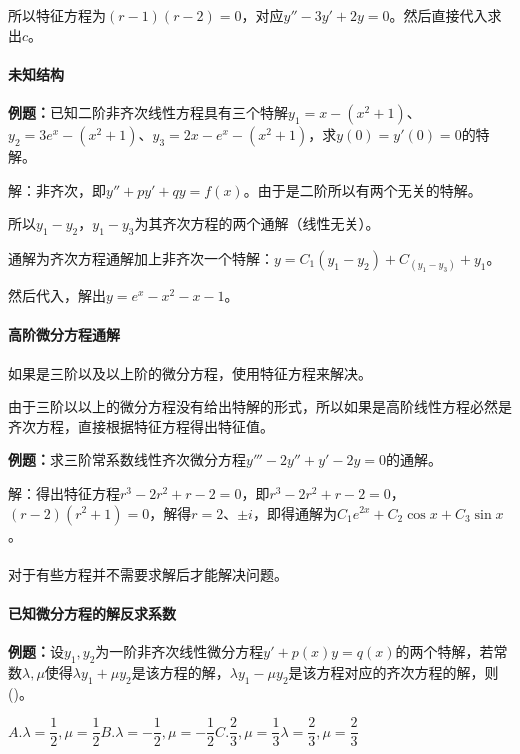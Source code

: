 所以特征方程为$(r-1)(r-2)=0$，对应$y''-3y'+2y=0$。然后直接代入求出$c$。

\paragraph{未知结构} \leavevmode \medskip

\textbf{例题：}已知二阶非齐次线性方程具有三个特解$y_1=x-(x^2+1)$、$y_2=3e^x-(x^2+1)$、$y_3=2x-e^x-(x^2+1)$，求$y(0)=y'(0)=0$的特解。

解：非齐次，即$y''+py'+qy=f(x)$。由于是二阶所以有两个无关的特解。

所以$y_1-y_2$，$y_1-y_3$为其齐次方程的两个通解（线性无关）。

通解为齐次方程通解加上非齐次一个特解：$y=C_1(y_1-y_2)+C_(y_1-y_3)+y_1$。

然后代入，解出$y=e^x-x^2-x-1$。

\paragraph{高阶微分方程通解}

如果是三阶以及以上阶的微分方程，使用特征方程来解决。

由于三阶以以上的微分方程没有给出特解的形式，所以如果是高阶线性方程必然是齐次方程，直接根据特征方程得出特征值。

\textbf{例题：}求三阶常系数线性齐次微分方程$y'''-2y''+y'-2y=0$的通解。

解：得出特征方程$r^3-2r^2+r-2=0$，即$r^3-2r^2+r-2=0$，$(r-2)(r^2+1)=0$，解得$r=2$、$\pm i$，即得通解为$C_1e^{2x}+C_2\cos x+C_3\sin x$。

\paragraph{}

对于有些方程并不需要求解后才能解决问题。

\paragraph{已知微分方程的解反求系数}

\textbf{例题：}设$y_1,y_2$为一阶非齐次线性微分方程$y'+p(x)y=q(x)$的两个特解，若常数$\lambda,\mu$使得$\lambda y_1+\mu y_2$是该方程的解，$\lambda y_1-\mu y_2$是该方程对应的齐次方程的解，则()。

$A.\lambda=\dfrac{1}{2},\mu=\dfrac{1}{2}$\qquad$B.\lambda=-\dfrac{1}{2},\mu=-\dfrac{1}{2}$\qquad$C.\dfrac{2}{3},\mu=\dfrac{1}{3}$\qquad$\lambda=\dfrac{2}{3},\mu=\dfrac{2}{3}$

